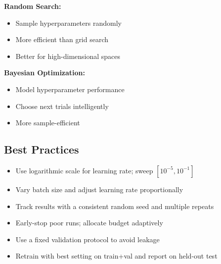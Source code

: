 \textbf{Random Search:}
\begin{itemize}
    \item Sample hyperparameters randomly
    \item More efficient than grid search
    \item Better for high-dimensional spaces
\end{itemize}

\textbf{Bayesian Optimization:}
\begin{itemize}
    \item Model hyperparameter performance
    \item Choose next trials intelligently
    \item More sample-efficient
\end{itemize}

\subsection{Best Practices}

\begin{itemize}
    \item Use logarithmic scale for learning rate; sweep $[10^{-5},10^{-1}]$
    \item Vary batch size and adjust learning rate proportionally
    \item Track results with a consistent random seed and multiple repeats
    \item Early-stop poor runs; allocate budget adaptively
    \item Use a fixed validation protocol to avoid leakage
    \item Retrain with best setting on train+val and report on held-out test
\end{itemize}



